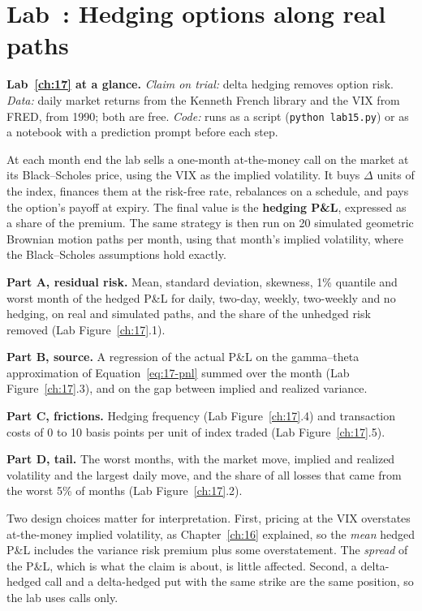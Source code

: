 \section{Lab~\thechapter: Hedging options along real paths}
\label{sec:17-lab}

\begin{callout}
\textbf{Lab~\ref{ch:17} at a glance.} \emph{Claim on trial:} delta hedging removes option risk. \emph{Data:} daily market returns from the Kenneth French library and the VIX from FRED, from 1990; both are free. \emph{Code:} runs as a script (\texttt{python lab15.py}) or as a notebook with a prediction prompt before each step.
\end{callout}

At each month end the lab sells a one-month at-the-money call on the market at its Black--Scholes price, using the VIX as the implied volatility. It buys $\Delta$ units of the index, finances them at the risk-free rate, rebalances on a schedule, and pays the option's payoff at expiry. The final value is the \textbf{hedging P\&L}, expressed as a share of the premium. The same strategy is then run on 20 simulated geometric Brownian motion paths per month, using that month's implied volatility, where the Black--Scholes assumptions hold exactly.

\textbf{Part A, residual risk.} Mean, standard deviation, skewness, 1\% quantile and worst month of the hedged P\&L for daily, two-day, weekly, two-weekly and no hedging, on real and simulated paths, and the share of the unhedged risk removed (Lab Figure~\ref{ch:17}.1).

\textbf{Part B, source.} A regression of the actual P\&L on the gamma--theta approximation of Equation~\eqref{eq:17-pnl} summed over the month (Lab Figure~\ref{ch:17}.3), and on the gap between implied and realized variance.

\textbf{Part C, frictions.} Hedging frequency (Lab Figure~\ref{ch:17}.4) and transaction costs of 0 to 10 basis points per unit of index traded (Lab Figure~\ref{ch:17}.5).

\textbf{Part D, tail.} The worst months, with the market move, implied and realized volatility and the largest daily move, and the share of all losses that came from the worst 5\% of months (Lab Figure~\ref{ch:17}.2).

Two design choices matter for interpretation. First, pricing at the VIX overstates at-the-money implied volatility, as Chapter~\ref{ch:16} explained, so the \emph{mean} hedged P\&L includes the variance risk premium plus some overstatement. The \emph{spread} of the P\&L, which is what the claim is about, is little affected. Second, a delta-hedged call and a delta-hedged put with the same strike are the same position, so the lab uses calls only.

